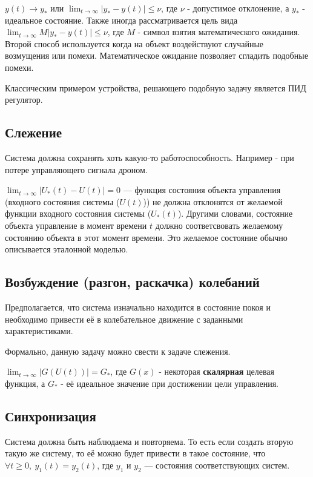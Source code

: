 \documentclass[12pt]{article}
\begin{document}
\begin{sloppypar}
    $y(t) \rightarrow y_* \text{ или } \lim_{t \rightarrow \infty}{|y_* - y(t)|}
        \leq \nu$, где $\nu$
    - допустимое отклонение, а $y_*$ - идеальное состояние.
    Также иногда рассматривается цель вида $\lim_{t \rightarrow \infty}{M|y_* -
            y(t)|} \leq \nu$, где $M$ - символ взятия математического ожидания.
    Второй способ используется когда на объект воздействуют случайные возмущения
    или помехи.  Математическое ожидание позволяет сгладить подобные помехи.

    Классическим примером устройства, решающего подобную задачу является ПИД
    регулятор.

    \subsection{Слежение}
    Система должна сохранять хоть какую-то работоспособность.
    Например - при потере управляющего сигнала дроном.

    $\lim_{t \rightarrow \infty} |U_*(t) - U(t)| = 0$ — функция состояния
    объекта управления (входного состояния системы ($U(t)$)) не должна
    отклонятся от желаемой функции входного состояния системы ($U_*(t)$).
    Другими словами, состояние объекта управление в момент времени $t$ должно
    соответсвовать желаемому состоянию объекта в этот момент времени. Это
    желаемое состояние обычно описывается эталонной моделью.

    \subsection{Возбуждение (разгон, раскачка) колебаний}
    Предполагается, что система изначально находится в состояние покоя и
    необходимо привести её в колебательное движение с заданными
    характеристиками.

    Формально, данную задачу можно свести к задаче слежения.

    $\lim_{t \rightarrow \infty} |G(U(t))| = G_*$, где $G(x)$ - некоторая
    \textbf{скалярная} целевая функция, а $G_*$ - её идеальное значение при
    достижении цели управления.

    \subsection{Синхронизация}
    Система должна быть наблюдаема и повторяема. То есть если создать вторую
    такую же систему, то её можно будет привести в такое состояние, что
    $\forall t \geq 0,\ y_1(t) = y_2(t)$, где $y_1$ и $y_2$ — состояния
    соответствующих систем.


\end{sloppypar}
\end{document}
